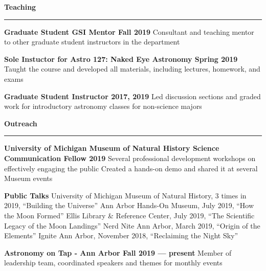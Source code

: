 \documentclass[10pt]{article}
\newcommand{\header}[1]{\vspace{2em}\par \textbf{\large #1}\strut\hrule\vspace{0em}}
\newcommand{\actionHeader}[2]{\textbf{#1 \hfill #2}}
\newcommand{\indentedItem}[1]{\newline\null\qquad #1}
\begin{document}
\header{Teaching}

\actionHeader{Graduate Student GSI Mentor}{Fall 2019}
\indentedItem{Consultant and teaching mentor to other graduate student instructors in the department}

\actionHeader{Sole Instuctor for Astro 127: Naked Eye Astronomy}{Spring 2019}
\indentedItem{Taught the course and developed all materials, including lectures, homework, and exams}

\actionHeader{Graduate Student Instructor}{2017, 2019}
\indentedItem{Led discussion sections and graded work for introductory astronomy classes for non-science majors}




\pagebreak

\header{Outreach}

\actionHeader{University of Michigan Museum of Natural History Science Communication Fellow}{2019}
\indentedItem{Several professional development workshops on effectively engaging the public}
\indentedItem{Created a hands-on demo and shared it at several Museum events}

\actionHeader{Public Talks}{}
\indentedItem{University of Michigan Museum of Natural History, 3 times in 2019, ``Building the Universe''}
\indentedItem{Ann Arbor Hands-On Museum, July 2019, ``How the Moon Formed''}
\indentedItem{Ellis Library \& Reference Center, July 2019, ``The Scientific Legacy of the Moon Landings''}
\indentedItem{Nerd Nite Ann Arbor, March 2019, ``Origin of the Elements''}
\indentedItem{Ignite Ann Arbor, November 2018, ``Reclaiming the Night Sky''}

\actionHeader{Astronomy on Tap - Ann Arbor}{Fall 2019 --- present}
\indentedItem{Member of leadership team, coordinated speakers and themes for monthly events}
\end{document}
